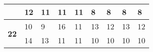 \begin{table}[!htbp]
{\begin{tabular}{|c|ll|ll|ll|ll|}
                                 & \multicolumn{1}{l|}{12}                                                                                 & 11                                                                                                   & \multicolumn{1}{l|}{11}                                                                                 & 11                                                                                                   & \multicolumn{1}{l|}{8}                                                                                  & 8                                                                                                    & \multicolumn{1}{l|}{8}                                                                                  & 8                                                                                                    \\ \hline
\multirow{2}{*}{\textbf{22}}     & \multicolumn{1}{l|}{10}                                                                                 & 9                                                                                                    & \multicolumn{1}{l|}{16}                                                                                 & 11                                                                                                   & \multicolumn{1}{l|}{13}                                                                                 & 12                                                                                                   & \multicolumn{1}{l|}{13}                                                                                 & 12                                                                                                   \\ \cline{2-9} 
                                 & \multicolumn{1}{l|}{14}                                                                                 & 13                                                                                                   & \multicolumn{1}{l|}{11}                                                                                 & 11                                                                                                   & \multicolumn{1}{l|}{10}                                                                                 & 10                                                                                                   & \multicolumn{1}{l|}{10}                                                                                 & 10                                                                                                   \\ \hline

\end{tabular}}
\end{table}
